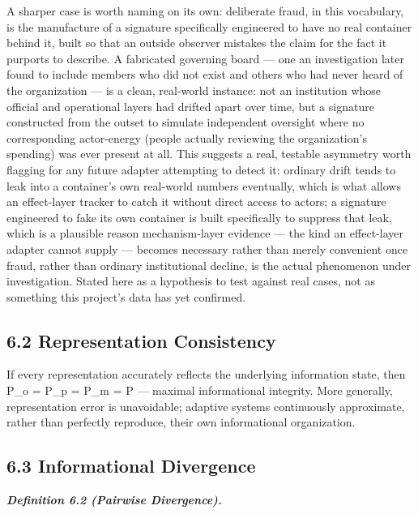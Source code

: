\documentclass[
]{article}
\begin{document}
A sharper case is worth naming on its own: deliberate fraud, in this
vocabulary, is the manufacture of a signature specifically engineered to
have no real container behind it, built so that an outside observer
mistakes the claim for the fact it purports to describe. A fabricated
governing board --- one an investigation later found to include members
who did not exist and others who had never heard of the organization ---
is a clean, real-world instance: not an institution whose official and
operational layers had drifted apart over time, but a signature
constructed from the outset to simulate independent oversight where no
corresponding actor-energy (people actually reviewing the organization's
spending) was ever present at all. This suggests a real, testable
asymmetry worth flagging for any future adapter attempting to detect it:
ordinary drift tends to leak into a container's own real-world numbers
eventually, which is what allows an effect-layer tracker to catch it
without direct access to actors; a signature engineered to fake its own
container is built specifically to suppress that leak, which is a
plausible reason mechanism-layer evidence --- the kind an effect-layer
adapter cannot supply --- becomes necessary rather than merely
convenient once fraud, rather than ordinary institutional decline, is
the actual phenomenon under investigation. Stated here as a hypothesis
to test against real cases, not as something this project's data has yet
confirmed.

\hypertarget{representation-consistency}{%
\subsection{6.2 Representation
Consistency}\label{representation-consistency}}

If every representation accurately reflects the underlying information
state, then P\_o = P\_p = P\_m = P --- maximal informational integrity.
More generally, representation error is unavoidable; adaptive systems
continuously approximate, rather than perfectly reproduce, their own
informational organization.

\hypertarget{informational-divergence}{%
\subsection{6.3 Informational
Divergence}\label{informational-divergence}}

\emph{\textbf{Definition 6.2 (Pairwise Divergence).}}
\end{document}
